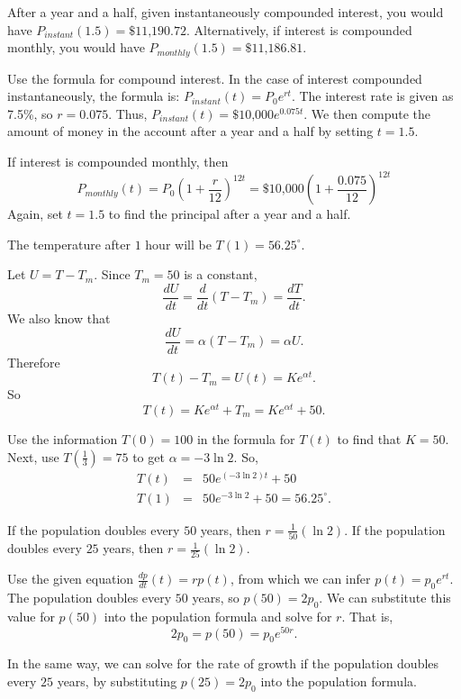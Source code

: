 \ans After a year and a half, given instantaneously compounded
interest, you would have
$P_{instant}(1.5) = \mbox{\$}11\mbox{,}190.72$.
Alternatively, if interest is compounded monthly, you would have
$P_{monthly}(1.5) = \mbox{\$}11\mbox{,}186.81$.

\soln Use the formula for compound interest.  In the case of interest
compounded instantaneously, the formula is:
$P_{instant}(t) = P_0e^{rt}$.  The interest rate is given as 7.5\%, so
$r = 0.075$.  Thus,
$P_{instant}(t) = \mbox{\$}10\mbox{,}000e^{0.075t}$.
We then compute the amount of money in the account after a year
and a half by setting $t = 1.5$.

\para If interest is compounded monthly, then
\[
P_{monthly}(t) = P_0\left(1 + \frac{r}{12}\right)^{12t} =
\mbox{\$}10\mbox{,}000\left(1 + \frac{0.075}{12}\right)^{12t}
\]
Again, set $t = 1.5$ to find the principal after a year and a half.

\ans The temperature after $1$ hour will be $T(1) = 56.25^{\circ}$.

\soln Let $U = T - T_m$.  Since $T_m = 50$ is a constant,
\[
\frac{dU}{dt} = \frac{d}{dt}(T - T_m) = \frac{dT}{dt}.
\]
We also know that
\[
\frac{dU}{dt} = \alpha (T - T_m) = \alpha U. \]
Therefore \[ T(t) - T_m = U(t) = Ke^{\alpha t}. \]
So \[ T(t) = Ke^{\alpha t} + T_m = Ke^{\alpha t} + 50. \]

Use the information $T(0) = 100$ in the formula for $T(t)$ to find that
$K = 50$.  Next, use $T(\frac{1}{3}) = 75$ to get $\alpha = -3\ln{2}$. So,
\[
\begin{array}{rcl}
T(t) & = & 50e^{(-3\ln{2})t} + 50 \\
T(1) & = & 50e^{-3\ln{2}} + 50 = 56.25^{\circ}.\end{array}
\]

\ans If the population doubles every $50$ years, then
$r = \frac{1}{50}(\ln 2)$.  If the population doubles every $25$
years, then $r = \frac{1}{25}(\ln 2)$.

\soln Use the given equation $\frac{dp}{dt}(t) = rp(t)$,
from which we can infer $p(t) = p_0e^{rt}$.
The population doubles every $50$ years, so $p(50) = 2p_0$.  We
can substitute this value for $p(50)$ into the population formula
and solve for $r$.  That is,
\[
2p_0 = p(50) = p_0e^{50r}.
\]

In the same way, we can solve for the rate of growth if the population
doubles every $25$ years, by substituting $p(25) = 2p_0$ into the
population formula.

